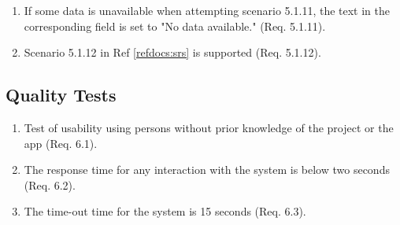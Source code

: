 \documentclass[a4paper]{article}
\newlength{\testlabellength}
\newenvironment{testlist}{\begin{enumerate}[label=\bfseries Test \thesubsection.\arabic* , labelindent=0pt, labelwidth=\testlabellength , leftmargin=2cm]}{\end{enumerate}}
\begin{document}
\begin{appendices}
\begin{testlist}
	\item If some data is unavailable when attempting scenario 5.1.11, the text in the corresponding field is set to "No data available." (Req. 5.1.11).
	
	\item Scenario 5.1.12 in Ref \ref{refdocs:srs} is supported (Req. 5.1.12).
\end{testlist}

\subsection{Quality Tests}

\begin{testlist}
	\item Test of usability using persons without prior knowledge of the project or the app (Req. 6.1).
	
	\item The response time for any interaction with the system is below two seconds (Req. 6.2).
	
	\item The time-out time for the system is 15 seconds (Req. 6.3). 
	
\end{testlist}

\clearpage

%
%
%
%
\end{appendices}
\end{document}
